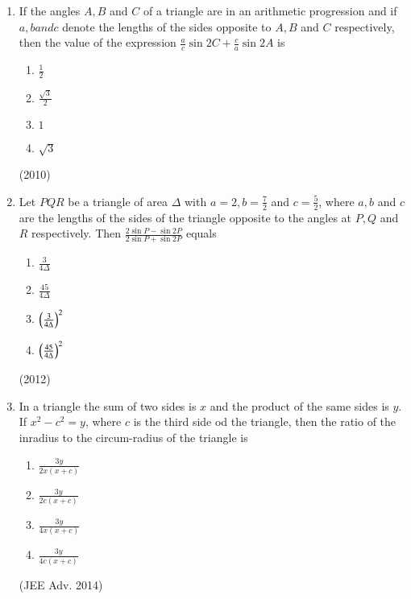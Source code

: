 \documentclass[journal,12pt,twocolumn]{IEEEtran}
\theoremstyle{remark}
\begin{document}
\begin{enumerate}
\item If the angles $A, B$ and $C$ of a triangle are in an arithmetic progression and if $a, b and c$ denote the lengths of the sides opposite to $A, B$ and $C$ respectively, then the value of the expression $\frac{a}{c}\sin 2C + \frac{c}{a} \sin 2A$ is
\begin{enumerate}
\item $\frac{1}{2}$
\item $\frac{\sqrt{3}}{2}$
\item $1$
\item $\sqrt{3}$
\end{enumerate}
\hfill (2010)

\item Let $PQR$ be a triangle of area $\Delta$ with $a=2, b= \frac{7}{2}$ and $c=\frac{5}{2}$, where $a, b$ and $c$ are the lengths of the sides of the triangle opposite to the angles at $P, Q$ and $R$ respectively. Then $\frac{2\sin P - \sin 2P}{2\sin P + \sin 2P}$ equals
\begin{enumerate}
\item $\frac{3}{4\Delta}$
\item $\frac{45}{4\Delta}$
\item $\left(\frac{3}{4\Delta}\right)^2$
\item $\left(\frac{45}{4\Delta}\right)^2$
\end{enumerate}
\hfill (2012)

\item In a triangle the sum of two sides is $x$ and the product of the same sides is $y$. If $x^2-c^2=y$, where $c$ is the third side od the triangle, then the ratio of the inradius to the circum-radius of the triangle is
\begin{enumerate}
\item $\frac{3y}{2x(x+c)}$
\item $\frac{3y}{2c(x+c)}$
\item $\frac{3y}{4x(x+c)}$
\item $\frac{3y}{4c(x+c)}$
\end{enumerate}
\hfill (JEE Adv. 2014)

\end{enumerate}
\end{document}

